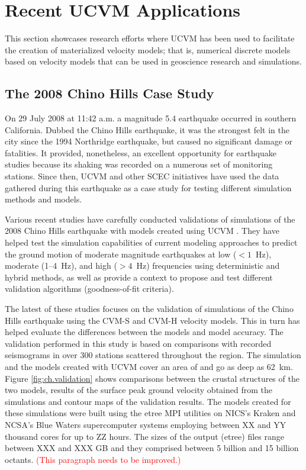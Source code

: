
\section{Recent UCVM Applications}

This section showcases research efforts where UCVM has been used to facilitate the creation of materialized velocity models; that is, numerical discrete models based on velocity models that can be used in geoscience research and simulations.

\subsection{The 2008 Chino Hills Case Study}

On 29 July 2008 at 11:42 a.m. a magnitude  5.4 earthquake occurred in southern California. Dubbed the Chino Hills earthquake, it was the strongest felt in the city since the 1994 Northridge earthquake, but caused no significant damage or fatalities. It provided, nonetheless, an excellent opportunity for earthquake studies because its shaking was recorded on a numerous set of monitoring stations. Since then, UCVM and other SCEC initiatives have used the data gathered during this earthquake as a case study for testing different simulation methods and models. 

Various recent studies have carefully conducted validations of simulations of the 2008 Chino Hills earthquake with models created using UCVM \citep[e.g.,][]{Olsen_2010_SRL, Taborda_2013_BSSA, Taborda_2014_BSSA}. They have helped test the simulation capabilities of current modeling approaches to predict the ground motion of moderate magnitude earthquakes at low ($<1$~Hz), moderate (1--4~Hz), and high ($>4$~Hz) frequencies using deterministic and hybrid methods, as well as provide a context to propose and test different validation algorithms (goodness-of-fit criteria). 

The latest of these studies \citep{Taborda_2014_BSSA} focuses on the validation of simulations of the Chino Hills earthquake using the CVM-S and CVM-H velocity models. This in turn has helped evaluate the differences between the models and model accuracy. The validation performed in this study is based on comparisons with recorded seismograms in over 300 stations scattered throughout the region. The simulation and the models created with UCVM cover an area of  and go as deep as 62~km. Figure \ref{fig:ch.validation} shows comparisons between the crustal structures of the two models, results of the surface peak ground velocity obtained from the simulations and contour maps of the validation results. The models created for these simulations were built using the etree MPI utilities on NICS's Kraken and NCSA's Blue Waters supercomputer systems employing between XX and YY thousand cores for up to ZZ hours. The sizes of the output (etree) files range between XXX and XXX GB and they comprised between 5 billion and 15 billion octants. \textcolor{red}{(This paragraph needs to be improved.)}

